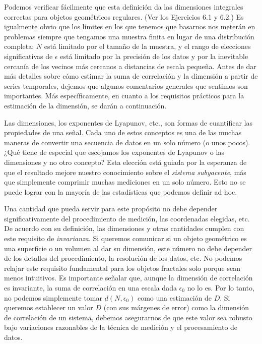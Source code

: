 \documentclass[10pt,a4paper]{book}
\begin{document}
Podemos verificar fácilmente que esta definición da las dimensiones integrales correctas para objetos geométricos regulares. (Ver los Ejercicios 6.1 y 6.2.) Es igualmente obvio que los límites en los que tenemos que basarnos nos meterán en problemas siempre que tengamos una muestra finita en lugar de una distribución completa: \(N\) está limitado por el tamaño de la muestra, y el rango de elecciones significativas de \(\epsilon\) está limitado por la precisión de los datos y por la inevitable cercanía de los vecinos más cercanos a distancias de escala pequeña. Antes de dar más detalles sobre cómo estimar la suma de correlación y la dimensión a partir de series temporales, dejemos que algunos comentarios generales que sentimos son importantes. Más específicamente, en cuanto a los requisitos prácticos para la estimación de la dimensión, se darán a continuación.

\bigskip

Las dimensiones, los exponentes de Lyapunov, etc., son formas de cuantificar las propiedades de una señal. Cada uno de estos conceptos es una de las muchas maneras de convertir una secuencia de datos en un solo número (o unos pocos). ¿Qué tiene de especial que escojamos los exponentes de Lyapunov o las dimensiones y no otro concepto? Esta elección está guiada por la esperanza de que el resultado mejore nuestro conocimiento sobre el \textit{sistema subyacente}, más que simplemente comprimir muchas mediciones en un solo número. Esto no se puede lograr con la mayoría de las estadísticas que podemos definir ad hoc.

\bigskip

Una cantidad que pueda servir para este propósito no debe depender significativamente del procedimiento de medición, las coordenadas elegidas, etc. De acuerdo con su definición, las dimensiones y otras cantidades cumplen con este requisito de \textit{invarianza}. Si queremos comunicar si un objeto geométrico es una superficie o un volumen al dar su dimensión, este número no debe depender de los detalles del procedimiento, la resolución de los datos, etc. No podemos relajar este requisito fundamental para los objetos fractales solo porque sean menos intuitivos. Es importante señalar que, aunque la dimensión de correlación es invariante, la suma de correlación en una escala dada \(\epsilon_0\) no lo es. Por lo tanto, no podemos simplemente tomar \(d(N, \epsilon_0)\) como una estimación de \(D\). Si queremos establecer un valor \(D\) (con sus márgenes de error) como la dimensión de correlación de un sistema, debemos asegurarnos de que este valor sea robusto bajo variaciones razonables de la técnica de medición y el procesamiento de datos.
\end{document}
